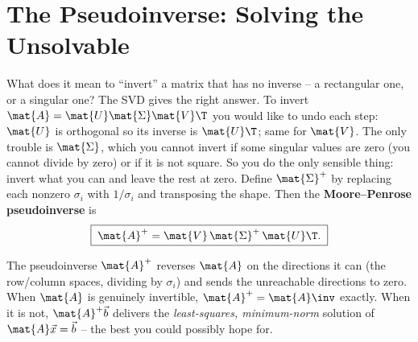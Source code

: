 \section{The Pseudoinverse: Solving the Unsolvable}
\label{ch29:pseudoinverse}

What does it mean to ``invert'' a matrix that has no inverse -- a rectangular one,
or a singular one? The SVD gives the right answer. To invert
$\mat{A} = \mat{U}\mat{\Sigma}\mat{V}\T$ you would like to undo each step:
$\mat{U}$ is orthogonal so its inverse is $\mat{U}\T$; same for $\mat{V}$. The only
trouble is $\mat{\Sigma}$, which you cannot invert if some singular values are
zero (you cannot divide by zero) or if it is not square. So you do the only
sensible thing: invert what you can and leave the rest at zero. Define
$\mat{\Sigma}^+$ by replacing each nonzero $\sigma_i$ with $1/\sigma_i$ and
transposing the shape. Then the \textbf{Moore--Penrose pseudoinverse} is
\[
  \boxed{\;\mat{A}^+ = \mat{V}\,\mat{\Sigma}^+\,\mat{U}\T.\;}
\]

\begin{focusbox}
The pseudoinverse $\mat{A}^+$ reverses $\mat{A}$ on the directions it can
(the row/column spaces, dividing by $\sigma_i$) and sends the unreachable
directions to zero. When $\mat{A}$ is genuinely invertible, $\mat{A}^+ =
\mat{A}\inv$ exactly. When it is not, $\mat{A}^+\vec{b}$ delivers the
\emph{least-squares, minimum-norm} solution of $\mat{A}\vec{x} = \vec{b}$ -- the
best you could possibly hope for.
\end{focusbox}


